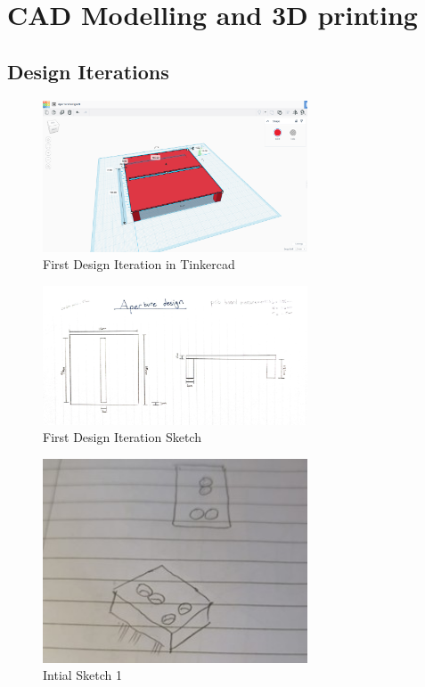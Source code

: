 \section{CAD Modelling and 3D printing}
\subsection{Design Iterations}

\begin{figure}[htbp]
    \centering
    \includegraphics[width=0.7\textwidth]{figures/Appendix-CAD/tinkercad_design.png}
    \caption*{First Design Iteration in Tinkercad} 
    \label{fig:tinkercad-design}
    \end{figure}

    \begin{figure}[htbp]
        \centering
        \includegraphics[width=0.7\textwidth]{figures/Appendix-CAD/FirstSketch.png}
        \caption*{First Design Iteration Sketch} 
        \label{fig:first-sketch}
        \end{figure}
    
        \begin{figure}[htbp]
            \centering
            \includegraphics[width=0.7\textwidth]{figures/Appendix-CAD/IntialSketch1.jpg}
            \caption*{Intial Sketch 1} 
            \label{fig:inital-sketch-1}
            \end{figure}

